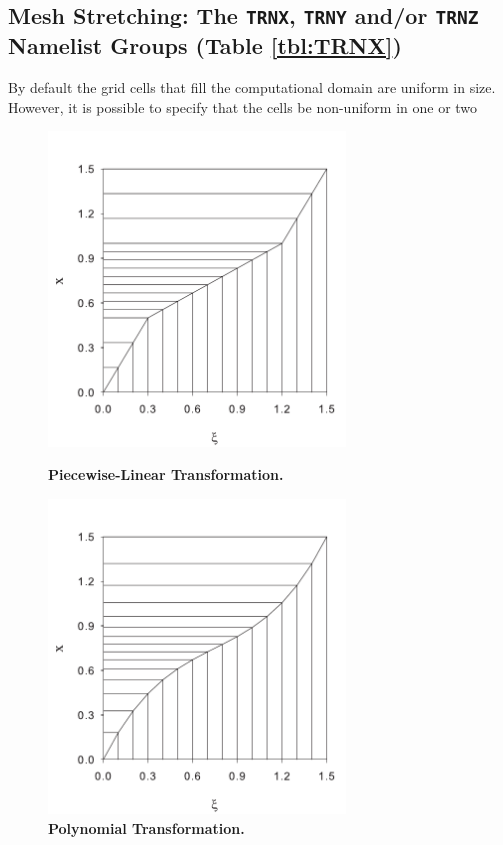 \documentclass[11pt]{book}
\begin{document}
\subsection{Mesh Stretching: The \texorpdfstring{{\tt TRNX}}{TRNX}, \texorpdfstring{{\tt TRNY}}{TRNY} and/or \texorpdfstring{{\tt TRNZ}}{TRNZ} Namelist Groups (Table \ref{tbl:TRNX})}
\label{info:TRNX}

By default the grid cells that fill the computational domain are uniform in size.
However, it is possible to specify that the cells be non-uniform in one or two
\begin{figure}[ht]
\begin{minipage}[t]{3.1in}
\includegraphics[width=3.1in]{FIGURES/piece_wise_linear}
\vspace{-.2in}
\caption{\bf Piecewise-Linear Transformation.}
\label{fig:grid2}
\end{minipage}
\hfill
\begin{minipage}[t]{3.1in}
\includegraphics[width=3.1in]{FIGURES/polygonal}
\vspace{-.2in}
\caption{\bf Polynomial Transformation.}
\label{fig:grid1}
\end{minipage}
\end{figure}
\end{document}
